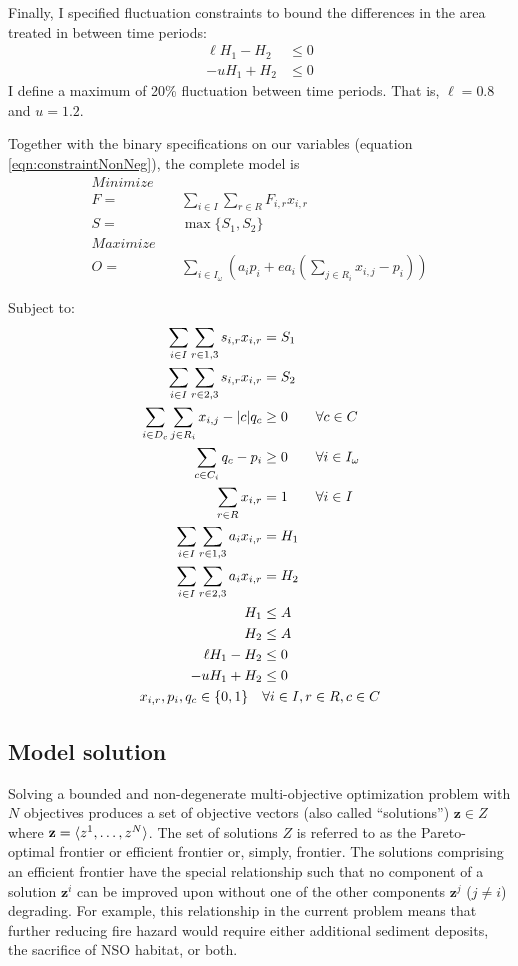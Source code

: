 Finally, I specified fluctuation constraints to bound the differences in the area treated in between time periods:
\begin{align}
\ell H_1 - H_2 &\le 0 \label{eqn:constraintAreaFlucL}\\
-u H_1 + H_2 &\le 0 \label{eqn:constraintAreaFlucU}
\end{align}
I define a maximum of 20\% fluctuation between time periods. That is, $\ell = 0.8$ and $u = 1.2$.

Together with the binary specifications on our variables (equation \eqref{eqn:constraintNonNeg}), the complete model is
\begin{align*}
Minimize \quad & \\
F=&\sum_{i\in I}\sum_{r\in R} F_{i,r} x_{i,r}\\
S=&\max \{S_1,S_2\}\\
Maximize \quad & \\
O=&\sum_{i\in I_\omega} \left(a_i p_i + e a_i \left( \sum_{j \in R_i} x_{i,j}-p_i \right) \right)
\end{align*}

Subject to:
\begin{align}
\sum_{i\in I} \sum_{r\in 1,3} s_{i,r} x_{i,r} &= S_1 \notag\\
\sum_{i\in I} \sum_{r\in 2,3} s_{i,r} x_{i,r} &= S_2 \notag\\
\sum_{i \in D_c} \sum_{j \in R_i}x_{i,j} - |c| q_c &\ge 0 \qquad \forall c \in C \notag\\
\sum_{c \in C_i} q_c - p_i &\ge 0 \qquad \forall i \in I_\omega \notag\\
\sum_{r \in R} x_{i,r} &= 1  \qquad \forall i \in I \notag\\
\sum_{i \in I} \sum_{r \in 1,3} a_i x_{i,r} &= H_1 \notag\\
\sum_{i \in I} \sum_{r \in 2,3} a_i x_{i,r} &= H_2 \notag\\
H_1 &\le A \notag\\
H_2 &\le A \notag\\
\ell H_1 - H_2 &\le 0 \notag\\
-u H_1 + H_2 &\le 0 \notag\\
x_{i,r}, p_i, q_c \in \{0,1\} \quad &\forall i \in I, r \in R, c \in C \label{eqn:constraintNonNeg}
\end{align}

\subsection{Model solution}
Solving a bounded and non-degenerate multi-objective optimization problem with $N$ objectives produces a set of objective vectors (also called ``solutions'') $\mathbf{z} \in Z$ where $\mathbf{z}=\braket{z^1,\ldots,z^N}$. The set of solutions $Z$ is referred to as the Pareto-optimal frontier or efficient frontier or, simply, frontier. The solutions comprising an efficient frontier have the special relationship such that no component of a solution $\mathbf{z}^i$ can be improved upon without one of the other components $\mathbf{z}^j$ ($j \neq i$) degrading. For example, this relationship in the current problem means that further reducing fire hazard would require either additional sediment deposits, the sacrifice of NSO habitat, or both.

